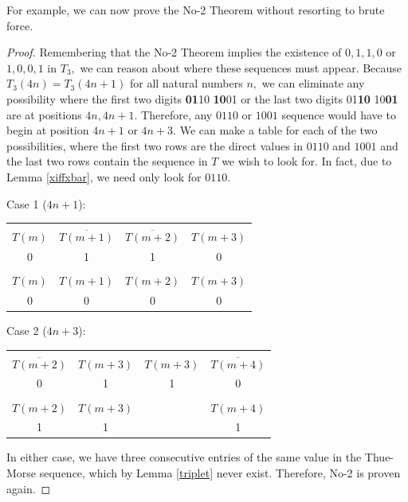 \documentclass{article}
\begin{document}
For example, we can now prove the No-2 Theorem without resorting to brute force.
\begin{proof}
Remembering that the No-2 Theorem implies the existence of $0, 1, 1, 0$ or $1, 0, 0, 1$ in $T_3,$ we can reason about where these sequences must appear. Because $T_3(4n) = T_3(4n + 1)$ for all natural numbers $n,$ we can eliminate any possibility where the first two digits \textbf{01}10 \textbf{10}01 or the last two digits 01\textbf{10} 10\textbf{01} are at positions $4n, 4n+1.$ Therefore, any $0110$ or $1001$ sequence would have to begin at position $4n+1$ or $4n+3.$ We can make a table for each of the two possibilities, where the first two rows are the direct values in $0110$ and $1001$ and the last two rows contain the sequence in $T$ we wish to look for. In fact, due to Lemma \ref{xiffxbar}, we need only look for $0110.$

Case 1 ($4n+1$):

\begin{center}
\begin{tabular}{ |c|c|c|c| } 
 \hline
 &&&\\
$T(m)$ & $\overline{T(m+1)}$ & $\overline{T(m+2)}$ & $T(m+3)$ \\ 
0 & 1 & 1 & 0 \\
\hline
&&&\\
$T(m)$ & $T(m+1)$ & $T(m+2)$ & $T(m+3)$ \\
0 & 0 & 0 & 0 \\
 \hline
\end{tabular}
\end{center}

Case 2 ($4n+3$):

\begin{center}
\begin{tabular}{ |c|c|c|c| } 
 \hline
 &&&\\
$\overline{T(m+2)}$ & $T(m+3)$ & $T(m+3)$ & $\overline{T(m+4)}$ \\ 
0 & 1 & 1 & 0 \\
\hline
&&&\\
$T(m+2)$ & $T(m+3)$ & & $T(m+4)$ \\
1 & 1 &  & 1 \\
 \hline
\end{tabular}
\end{center}

In either case, we have three consecutive entries of the same value in the Thue-Morse sequence, which by Lemma \ref{triplet} never exist. Therefore, No-2 is proven again.
\end{proof}
\end{document}
